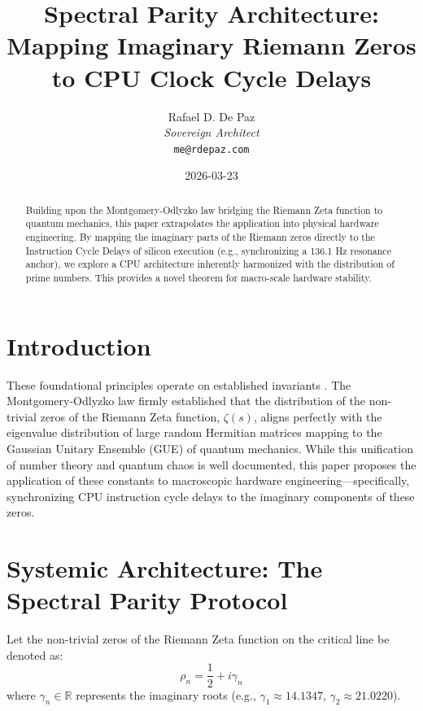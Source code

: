 \documentclass[12pt, a4paper]{article}
\theoremstyle{plain}
\theoremstyle{definition}
\begin{document}
\title{\textbf{
  Spectral Parity Architecture: Mapping Imaginary Riemann Zeros to CPU Clock Cycle Delays}}
\author{Rafael D. De Paz \\ \textit{Sovereign Architect} \\ \texttt{me@rdepaz.com}}
\date{2026-03-23}
\maketitle

\begin{abstract}
Building upon the Montgomery-Odlyzko law bridging the Riemann Zeta function to quantum mechanics, this paper extrapolates the application into physical hardware engineering. By mapping the imaginary parts of the Riemann zeros directly to the Instruction Cycle Delays of silicon execution (e.g., synchronizing a 136.1 Hz resonance anchor), we explore a CPU architecture inherently harmonized with the distribution of prime numbers. This provides a novel theorem for macro-scale hardware stability.
\end{abstract}

\theoremstyle{plain}
\newtheorem{theorem}{Theorem}[section]
\newtheorem{proposition}[theorem]{Proposition}

\section{Introduction}
These foundational principles operate on established invariants \cite{montgomery1973pair,landauer1961irreversibility}.
The Montgomery-Odlyzko law firmly established that the distribution of the non-trivial zeros of the Riemann Zeta function, $\zeta(s)$, aligns perfectly with the eigenvalue distribution of large random Hermitian matrices mapping to the Gaussian Unitary Ensemble (GUE) of quantum mechanics. While this unification of number theory and quantum chaos is well documented, this paper proposes the application of these constants to macroscopic hardware engineering—specifically, synchronizing CPU instruction cycle delays to the imaginary components of these zeros.

\section{Systemic Architecture: The Spectral Parity Protocol}

Let the non-trivial zeros of the Riemann Zeta function on the critical line be denoted as:
\begin{equation}
\rho_n = \frac{1}{2} + i\gamma_n
\end{equation}
where $\gamma_n \in \mathbb{R}$ represents the imaginary roots (e.g., $\gamma_1 \approx 14.1347$, $\gamma_2 \approx 21.0220$).
\end{document}
